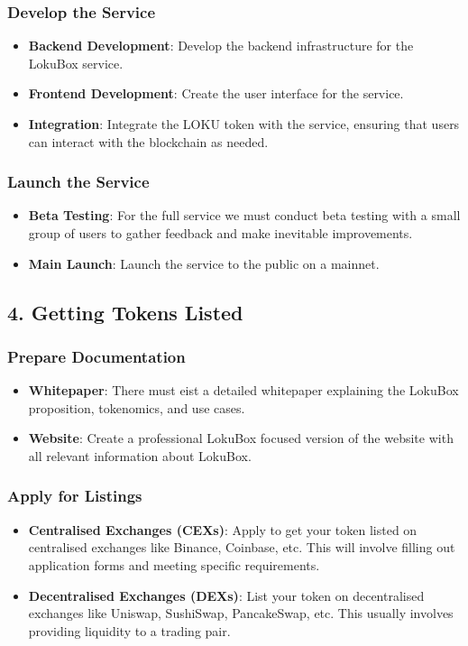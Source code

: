 \documentclass{tufte-handout}
\begin{document}
\subsubsection*{Develop the Service}
\begin{itemize}
    \item \textbf{Backend Development}: Develop the backend infrastructure for the LokuBox service.
    \item \textbf{Frontend Development}: Create the user interface for the service.
    \item \textbf{Integration}: Integrate the LOKU token with the service, ensuring that users can interact with the blockchain as needed.
\end{itemize}

\subsubsection*{Launch the Service}
\begin{itemize}
    \item \textbf{Beta Testing}: For the full service we must conduct beta testing with a small group of users to gather feedback and make inevitable improvements.
    \item \textbf{Main Launch}: Launch the service to the public on a mainnet.
\end{itemize}

\subsection*{4. Getting Tokens Listed}

\subsubsection*{Prepare Documentation}
\begin{itemize}
    \item \textbf{Whitepaper}: There must eist a detailed whitepaper explaining the LokuBox proposition, tokenomics, and use cases.
    \item \textbf{Website}: Create a professional LokuBox focused version of the website with all relevant information about LokuBox.
\end{itemize}

\subsubsection*{Apply for Listings}
\begin{itemize}
    \item \textbf{Centralised Exchanges (CEXs)}: Apply to get your token listed on centralised exchanges like Binance, Coinbase, etc.
    This will involve filling out application forms and meeting specific requirements.
    \item \textbf{Decentralised Exchanges (DEXs)}: List your token on decentralised exchanges like Uniswap, SushiSwap, PancakeSwap, etc.
    This usually involves providing liquidity to a trading pair.
\end{itemize}
\end{document}
